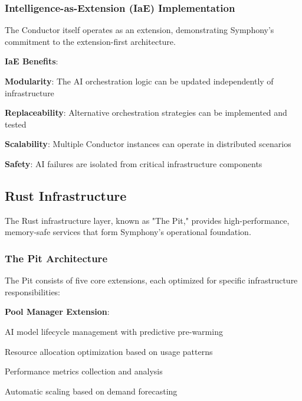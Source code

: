 \subsubsection*{Intelligence-as-Extension (IaE) Implementation}

The Conductor itself operates as an extension, demonstrating Symphony's commitment to the extension-first architecture.

\textbf{IaE Benefits}:
\begin{compactlist}
    \item \textbf{Modularity}: The AI orchestration logic can be updated independently of infrastructure
    \item \textbf{Replaceability}: Alternative orchestration strategies can be implemented and tested
    \item \textbf{Scalability}: Multiple Conductor instances can operate in distributed scenarios
    \item \textbf{Safety}: AI failures are isolated from critical infrastructure components
\end{compactlist}

\subsection*{Rust Infrastructure}

The Rust infrastructure layer, known as "The Pit," provides high-performance, memory-safe services that form Symphony's operational foundation.

\subsubsection*{The Pit Architecture}

The Pit consists of five core extensions, each optimized for specific infrastructure responsibilities:

\textbf{Pool Manager Extension}:
\begin{compactlist}
    \item AI model lifecycle management with predictive pre-warming
    \item Resource allocation optimization based on usage patterns
    \item Performance metrics collection and analysis
    \item Automatic scaling based on demand forecasting
\end{compactlist}

